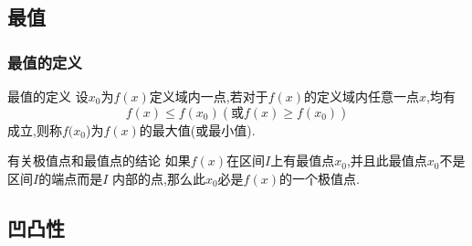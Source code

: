 \documentclass[8pt a4paper, oneside, UTF8]{ctexbook}  %
\begin{document}
\begin{sloppypar}
    \subsection{最值}
    \subsubsection{最值的定义}
    \begin{defn}{最值的定义}{}
        设$x_0$为$f(x)$定义域内一点,若对于$f(x)$的定义域内任意一点$x$,均有
        $$
            f(x)\leqslant f(x_0)(\text{或}f(x)\geqslant f(x_0))
        $$
        成立,则称$f(x_0$)为$f(x)$的最大值(或最小值).
    \end{defn}
    \begin{conclusion}{有关极值点和最值点的结论}{}
        如果$f(x)$在区间$I$上有最值点$x_0$,并且此最值点$x_0$不是区间$I$的端点而是$I$ 内部的点,那么此$x_0$必是$f(x)$的一个极值点.
    \end{conclusion}
  
    \subsection{凹凸性}

\end{sloppypar}
\end{document}
